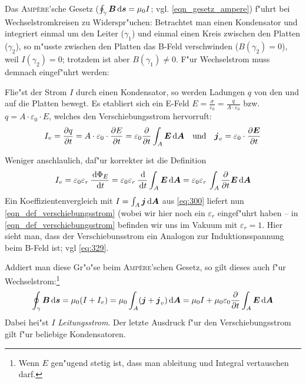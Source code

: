 Das \textsc{Amp\`ere}'sche Gesetz ($ \oint_\gamma \boldsymbol{B} \, \mathrm{d} \boldsymbol{s}
= \mu_0 I$; vgl. \eqref{eqn_gesetz_ampere}) f"uhrt bei
Wechselstromkreisen zu Widerspr"uchen: Betrachtet man einen
Kondensator und integriert einmal um den Leiter ($\gamma_1$) und
einmal einen Kreis zwischen den Platten ($\gamma_2$), so m"usste
zwischen den Platten das B-Feld verschwinden ($B(\gamma_2) = 0$), weil
$I(\gamma_2) = 0$; trotzdem ist aber $B(\gamma_1) \neq 0$. F"ur
Wechselstrom muss demnach eingef"uhrt werden:
\begin{Def}
    Flie"st der Strom $I$ durch einen Kondensator, so werden
   Ladungen $q$ von den und auf die Platten bewegt. Es etabliert sich
   ein E-Feld $E = \frac{\sigma}{\varepsilon_0} = \frac{q}{A\cdot
     \varepsilon_0}$ bzw. $q = A \cdot \varepsilon_0 \cdot E$, welches
   den Verschiebungsstrom hervorruft:
   \begin{equation}
      \label{eqn_def_verschiebungsstrom}
      I_v = \frac{\partial q}{\partial t } = A \cdot \varepsilon_0
      \cdot \frac{\partial E}{\partial t} = \varepsilon_0
      \frac{\partial }{\partial t} \int_A \boldsymbol{E} \, \mathrm{d} \boldsymbol{A} ~ ~ \text{ und } ~ ~ \boldsymbol{j}_v = \varepsilon_0 \cdot \frac{\partial \boldsymbol{E}}{\partial t}
   \end{equation}
\end{Def}
Weniger anschlaulich, daf"ur korrekter ist die Definition
  \begin{equation*}
     I_v = \varepsilon_0 \varepsilon_r \, \frac{\, \mathrm{d}
       \Phi_E}{\, \mathrm{d} t}
     =
     \varepsilon_0 \varepsilon_r \, \frac{\, \mathrm{d}
     }{\, \mathrm{d} t} \int_A \boldsymbol{E} \, \mathrm{d} \boldsymbol{A} 
     =
     \varepsilon_0 \varepsilon_r \, \int_A \frac{\partial }{\partial t}\boldsymbol{E} \, \mathrm{d} \boldsymbol{A} 
  \end{equation*}
Ein Koeffizientenvergleich mit $I = \int_A \boldsymbol{j} \, \mathrm{d} \boldsymbol{A}$ aus
\eqref{eq:300} liefert nun \eqref{eqn_def_verschiebungsstrom} (wobei
wir hier noch ein $\varepsilon_r$ eingef"uhrt haben -- in
\eqref{eqn_def_verschiebungsstrom} befinden wir uns im Vakuum mit
$\varepsilon_r = 1$. Hier
sieht man, dass  der Verschiebunsstrom ein Analogon zur
Induktionsspannung beim B-Feld ist; vgl \eqref{eq:329}.

Addiert man diese Gr"o"se beim \textsc{Amp\`ere}'schen Gesetz, so gilt
dieses auch f"ur Wechselstrom:\footnote{Wenn $E$ gen"ugend stetig ist,
  dass man ableitung und Integral vertauschen darf.}
\begin{equation}
   \label{eqn_gesetz_ampere_allg}
   \oint_\gamma \boldsymbol{B} \, \mathrm{d} \boldsymbol{s} = \mu_0 (I + I_v) = \mu_0 \int_A
   (\boldsymbol{j} + \boldsymbol{j}_v) \, \mathrm{d} \boldsymbol{A} = \mu_0I + \mu_0 \varepsilon_0
   \frac{\partial }{\partial t} \int_A \boldsymbol{E} \, \mathrm{d} \boldsymbol{A}
\end{equation}
Dabei hei"st $I$ \emph{Leitungsstrom}. Der letzte
Ausdruck f"ur den Verschiebungsstrom gilt f"ur beliebige Kondensatoren.

